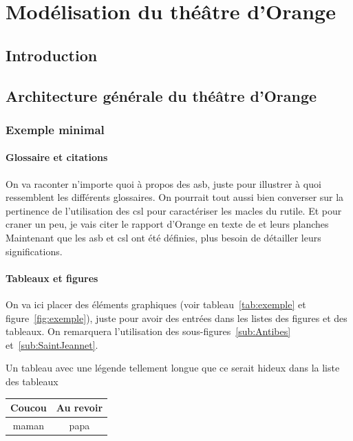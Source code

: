 \part{Modélisation du théâtre d’Orange}

	\chapter*{Introduction}

	\chapter{Architecture générale du théâtre d'Orange}
		\minitoc
		\newpage

		\section{Exemple minimal}
			\subsection{Glossaire et citations}
			On va raconter n'importe quoi à propos des \gls{asb}, juste pour illustrer à quoi ressemblent les différents glossaires. On pourrait tout aussi bien converser sur la 				pertinence de l'utilisation des \gls{csl} pour caractériser les \glspl{macle} du \gls{rutile}. Et pour craner un peu, je vais citer le rapport d'Orange en texte \cite{orangeTxt} 			de \citet{orangeTxt} et leurs planches \cite{orangePl}
			Maintenant que les \gls{asb} et \gls{csl} ont été définies, plus besoin de détailler leurs significations.
		
			\subsection{Tableaux et figures}
			On va ici placer des éléments graphiques (voir tableau~\ref{tab:exemple} et figure~\ref{fig:exemple}), juste pour avoir des entrées dans les listes des figures et des 				tableaux. On remarquera l'utilisation des sous-figures~\ref{sub:Antibes} et~\ref{sub:SaintJeannet}.
	
			\begin{tableth}
				\caption[Légende courte pour l'exemple de tableau]{Un tableau avec une légende tellement longue que ce serait hideux dans la liste des tableaux}
					\label{tab:exemple}
				\begin{tabular}{c|c}
					Coucou	& Au revoir\\
					\hline
					maman	& papa
				\end{tabular}
			\end{tableth}

